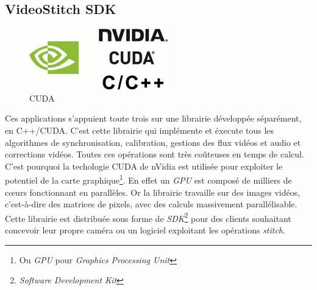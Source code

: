 \subsection{VideoStitch SDK}
\label{videostitch-sdk-section}
\begin{figure}
  \centering
  \includegraphics[width=6cm]{images/cuda.jpg}
  \caption{CUDA}
\end{figure}
Ces applications s'appuient toute trois sur une librairie développée séparément,
en C++/CUDA. C'est cette librairie qui implémente et éxecute tous les algorithmes
de synchronisation, calibration, gestions des flux vidéos et audio et corrections
vidéos.
Toutes ces opérations sont très coûteuses en temps de calcul. C'est pourquoi
la techologie CUDA de nVidia est utilisée pour exploiter le potentiel de la carte
graphique\footnote{Ou \textit{GPU} pour \textit{Graphics Processing Unit}}. 
En effet un \textit{GPU} est composé de milliers de c\oe urs fonctionnant en parallèles.
Or la librairie travaille sur des images vidéos, c'est-à-dire des matrices de pixels,
avec des calculs massivement parallélisable\cite{videostitch-cuda}.\\
\newline
Cette librairie est distribuée sous forme de \textit{SDK}\footnote{\textit{Software Development Kit}}
pour des clients souhaitant concevoir leur propre caméra ou un logiciel exploitant
les opérations \textit{stitch}.


